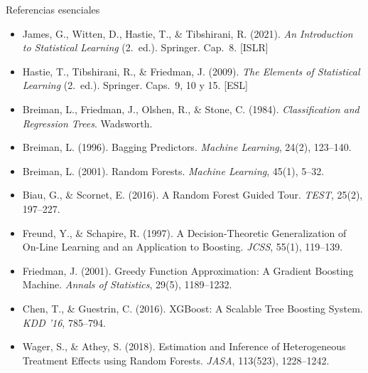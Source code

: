 \documentclass{beamer}
\newcommand{\1}{\mathbb{I}}
\begin{document}
\begin{frame}{Referencias esenciales}
\footnotesize
\begin{itemize}\itemsep2pt
  \item James, G., Witten, D., Hastie, T., \& Tibshirani, R. (2021). \emph{An Introduction to Statistical Learning} (2.\ ed.). Springer. Cap.\ 8. [ISLR]
  \item Hastie, T., Tibshirani, R., \& Friedman, J. (2009). \emph{The Elements of Statistical Learning} (2.\ ed.). Springer. Caps.\ 9, 10 y 15. [ESL]
  \item Breiman, L., Friedman, J., Olshen, R., \& Stone, C. (1984). \emph{Classification and Regression Trees}. Wadsworth.
  \item Breiman, L. (1996). Bagging Predictors. \emph{Machine Learning}, 24(2), 123--140.
  \item Breiman, L. (2001). Random Forests. \emph{Machine Learning}, 45(1), 5--32.
  \item Biau, G., \& Scornet, E. (2016). A Random Forest Guided Tour. \emph{TEST}, 25(2), 197--227.
  \item Freund, Y., \& Schapire, R. (1997). A Decision-Theoretic Generalization of On-Line Learning and an Application to Boosting. \emph{JCSS}, 55(1), 119--139.
  \item Friedman, J. (2001). Greedy Function Approximation: A Gradient Boosting Machine. \emph{Annals of Statistics}, 29(5), 1189--1232.
  \item Chen, T., \& Guestrin, C. (2016). XGBoost: A Scalable Tree Boosting System. \emph{KDD '16}, 785--794.
  \item Wager, S., \& Athey, S. (2018). Estimation and Inference of Heterogeneous Treatment Effects using Random Forests. \emph{JASA}, 113(523), 1228--1242.
\end{itemize}
\normalsize
\end{frame}

\end{document}

